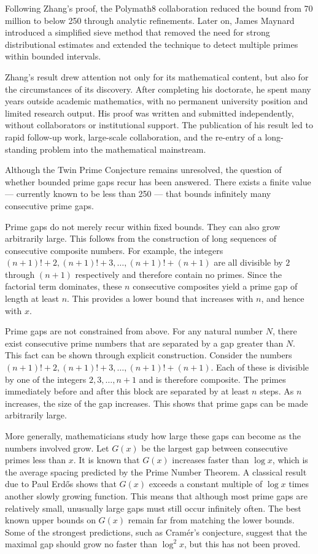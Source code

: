 Following Zhang's proof, the Polymath8 collaboration reduced the bound from 70 million to below 250 through analytic refinements. Later on, James Maynard introduced a simplified sieve method that removed the need for strong distributional estimates and extended the technique to detect multiple primes within bounded intervals.

Zhang's result drew attention not only for its mathematical content, but also for the circumstances of its discovery. After completing his doctorate, he spent many years outside academic mathematics, with no permanent university position and limited research output. His proof was written and submitted independently, without collaborators or institutional support. The publication of his result led to rapid follow-up work, large-scale collaboration, and the re-entry of a long-standing problem into the mathematical mainstream.

Although the Twin Prime Conjecture remains unresolved, the question of whether bounded prime gaps recur has been answered. There exists a finite value — currently known to be less than 250 — that bounds infinitely many consecutive prime gaps.

Prime gaps do not merely recur within fixed bounds. They can also grow arbitrarily large. This follows from the construction of long sequences of consecutive composite numbers. For example, the integers $(n+1)! + 2,  (n+1)! + 3,  \dots,  (n+1)! + (n+1)$ are all divisible by $2$ through $(n+1)$ respectively and therefore contain no primes. Since the factorial term dominates, these $n$ consecutive composites yield a prime gap of length at least $n$. This provides a lower bound that increases with $n$, and hence with $x$.

Prime gaps are not constrained from above. For any natural number $N$, there exist consecutive prime numbers that are separated by a gap greater than $N$. This fact can be shown through explicit construction. Consider the numbers $(n+1)! + 2,  (n+1)! + 3,  \dots,  (n+1)! + (n+1).$ Each of these is divisible by one of the integers $2, 3, \dots, n+1$ and is therefore composite. The primes immediately before and after this block are separated by at least $n$ steps. As $n$ increases, the size of the gap increases. This shows that prime gaps can be made arbitrarily large.

More generally, mathematicians study how large these gaps can become as the numbers involved grow. Let $G(x)$ be the largest gap between consecutive primes less than $x$. It is known that $G(x)$ increases faster than $\log x$, which is the average spacing predicted by the Prime Number Theorem. A classical result due to Paul Erdős shows that $G(x)$ exceeds a constant multiple of $\log x$ times another slowly growing function. This means that although most prime gaps are relatively small, unusually large gaps must still occur infinitely often. The best known upper bounds on $G(x)$ remain far from matching the lower bounds. Some of the strongest predictions, such as Cramér’s conjecture, suggest that the maximal gap should grow no faster than $\log^2 x$, but this has not been proved.

